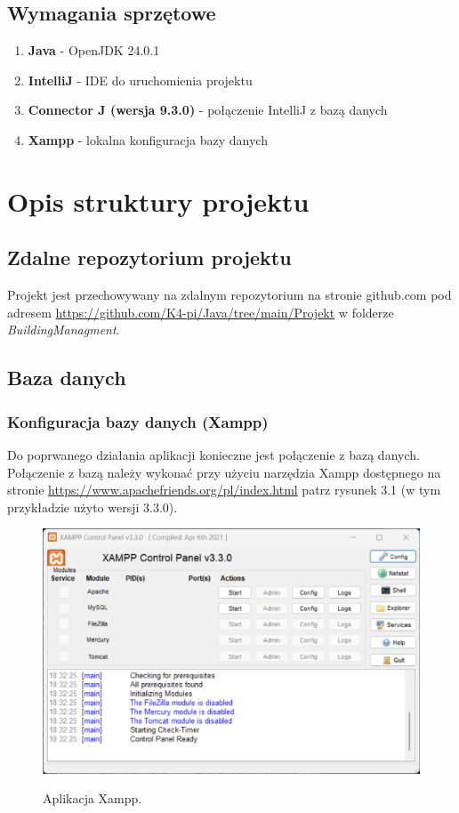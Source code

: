 \section{Wymagania sprzętowe}
\begin{enumerate}
    \item \textbf{Java} - OpenJDK 24.0.1
    \item \textbf{IntelliJ} - IDE do uruchomienia projektu
    \item \textbf{Connector J (wersja 9.3.0)} - połączenie IntelliJ z bazą danych
    \item \textbf{Xampp} - lokalna konfiguracja bazy danych
\end{enumerate}
\chapter{Opis struktury projektu}
\section{Zdalne repozytorium projektu}
Projekt jest przechowywany na zdalnym repozytorium na stronie github.com pod adresem 
\newline \url{https://github.com/K4-pi/Java/tree/main/Projekt} w folderze \textit{BuildingManagment}.

\section{Baza danych}
\subsection{Konfiguracja bazy danych (Xampp)}
Do poprwanego działania aplikacji konieczne jest połączenie z bazą danych.
Połączenie z bazą należy wykonać przy użyciu narzędzia Xampp dostępnego na stronie 
\url{https://www.apachefriends.org/pl/index.html} patrz rysunek 3.1 
(w tym przykładzie użyto wersji 3.3.0).

\begin{figure}[H]
    \centering
    \includegraphics[width=\linewidth]{figures/xampp.eps}\\
    \caption{Aplikacja Xampp.\label{fig1}}
\end{figure}

